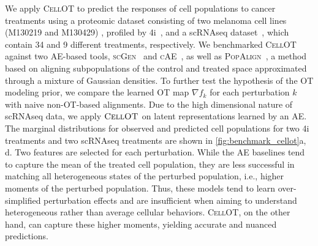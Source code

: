  We apply \textsc{CellOT} to predict the responses of cell populations to cancer treatments using a proteomic dataset consisting of two melanoma cell lines (M130219 and M130429) \citep{raaijmakers2015new}, profiled by \acrshort{4i}~\citep{gut2018multiplexed}, and a \acrshort{sc}\acrshort{RNAseq} dataset~\citep{srivatsan2020massively}, which contain 34 and 9 different treatments, respectively.
We benchmarked \textsc{CellOT} against two \acrlong{AE}-based tools, \textsc{scGen}~\citep{lotfollahi2019scgen} and \textsc{cAE}~\citep{lopez2018scvi}, as well as \textsc{PopAlign}~\citep{chen2020dissecting}, a method based on aligning subpopulations of the control and treated space approximated through a mixture of Gaussian densities.
To further test the hypothesis of the \acrlong{OT} modeling prior, we compare the learned \acrshort{OT} map $\nabla f_k$ for each perturbation $k$ with naive non-OT-based alignments.
Due to the high dimensional nature of \acrshort{sc}\acrshort{RNAseq} data, we apply $\textsc{CellOT}$ on latent representations learned by an \acrlong{AE}.
The marginal distributions for observed and predicted cell populations for two \acrshort{4i} treatments and two \acrshort{sc}\acrshort{RNAseq} treatments are shown in \cref{fig:benchmark_cellot}a, d. 
Two features are selected for each perturbation.
While the \acrlong{AE} baselines tend to capture the mean of the treated cell population, they are less successful in matching all heterogeneous states of the perturbed population, i.e., higher moments of the perturbed population.
Thus, these models tend to learn over-simplified perturbation effects and are insufficient when aiming to understand heterogeneous rather than average cellular behaviors.
\textsc{CellOT}, on the other hand, can capture these higher moments, yielding accurate and nuanced predictions.

